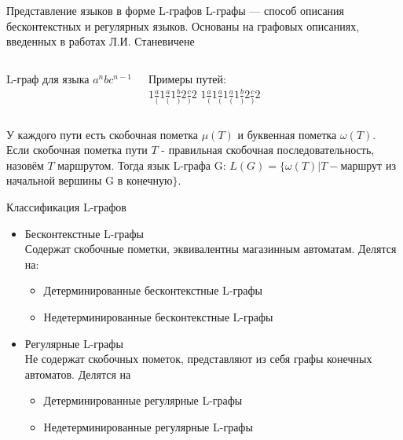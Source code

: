 \documentclass{beamer}
\begin{document}
\begin{frame}{Представление языков в форме L-графов}
L-графы --- способ описания бесконтекстных и регулярных языков. Основаны на графовых описаниях, введенных в работах Л.И. Станевичене
\begin{columns}
    L-граф для языка $a^nbc^{n-1}$
    Примеры путей:\\
    \LARGE{$1\frac{a}{(}1\frac{a}{(}1\frac{b}{)}2\frac{c}{)}2$}
    \vspace{0.8cm}
    \LARGE{$1\frac{a}{(}1\frac{a}{(}1\frac{a}{(}1\frac{b}{)}2\frac{c}{)}2$}\\
\end{columns}
У каждого пути есть скобочная пометка $\mu(T)$ и буквенная пометка $\omega(T)$. Если скобочная пометка пути $T$ - правильная скобочная последовательность, назовём $T$ маршрутом. Тогда язык L-графа G: $L(G) = \{\omega(T)|T-$маршрут из начальной вершины G в конечную$\}$.
\end{frame}

\begin{frame} {Классификация L-графов}
\begin{itemize}
  \item Бесконтекстные L-графы\\
    Содержат скобочные пометки, эквивалентны магазинным автоматам. Делятся на:
    \begin{itemize}
      \item Детерминированные бесконтекстные L-графы
      \item Недетерминированные бесконтекстные L-графы
    \end{itemize}
  \item Регулярные L-графы\\
  Не содержат скобочных пометок, представляют из себя графы конечных автоматов. Делятся на\\
  \begin{itemize}
      \item Детерминированные регулярные L-графы
      \item Недетерминированные регулярные L-графы
    \end{itemize}
\end{itemize}
\end{frame}
\end{document}
